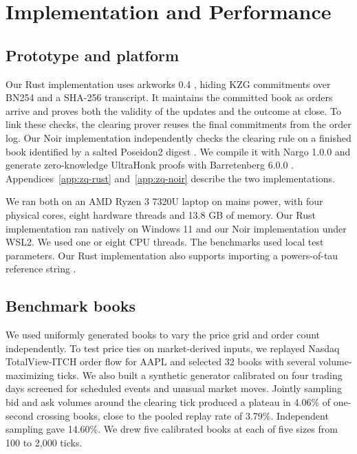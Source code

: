 
\section{Implementation and Performance}
\label{sec:zq-performance}

\subsection{Prototype and platform}
\label{sec:zq-platform}

Our Rust implementation uses arkworks 0.4 \cite{arkworks}, hiding KZG commitments over BN254 and a SHA-256 transcript. It maintains the committed book as orders arrive and proves both the validity of the updates and the outcome at close. To link these checks, the clearing prover reuses the final commitments from the order log. Our Noir implementation independently checks the clearing rule on a finished book identified by a salted Poseidon2 digest \cite{poseidon2}. We compile it with Nargo 1.0.0 \cite{noir} and generate zero-knowledge UltraHonk proofs with Barretenberg 6.0.0 \cite{barretenberg}. Appendices~\ref{app:zq-rust} and~\ref{app:zq-noir} describe the two implementations.

We ran both on an AMD Ryzen 3 7320U laptop on mains power, with four physical cores, eight hardware threads and 13.8 GB of memory. Our Rust implementation ran natively on Windows 11 and our Noir implementation under WSL2. We used one or eight CPU threads. The benchmarks used local test parameters. Our Rust implementation also supports importing a powers-of-tau reference string \cite{nikolaenko2024}.

\subsection{Benchmark books}
\label{sec:zq-books}

We used uniformly generated books to vary the price grid and order count independently. To test price ties on market-derived inputs, we replayed Nasdaq TotalView-ITCH order flow for AAPL \cite{itch} and selected 32 books with several volume-maximizing ticks. We also built a synthetic generator calibrated on four trading days screened for scheduled events and unusual market moves. Jointly sampling bid and ask volumes around the clearing tick produced a plateau in 4.06\% of one-second crossing books, close to the pooled replay rate of 3.79\%. Independent sampling gave 14.60\%. We drew five calibrated books at each of five sizes from 100 to 2,000 ticks.

